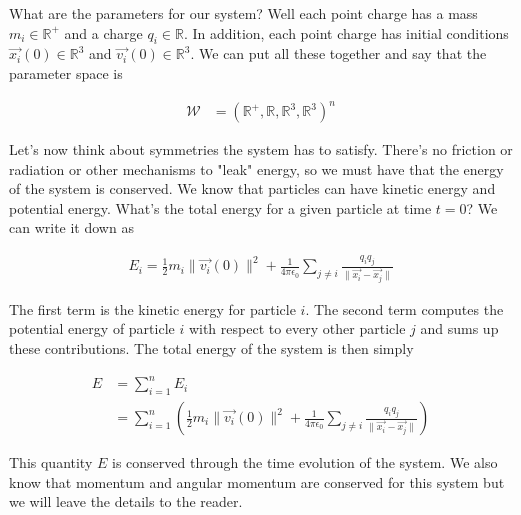 \documentclass[book.tex]{subfiles}
\begin{document}
What are the parameters for our system? Well each point charge has a mass $m_i \in \mathbb{R}^+$ and a charge $q_i \in \mathbb{R}$. In addition, each point charge has initial conditions $\vec{x_i}(0) \in \mathbb{R}^3$ and $\vec{v_i}(0) \in \mathbb{R}^3$. We can put all these together and say that the parameter space is

\begin{align}
    \mathcal{W} &= (\mathbb{R}^+, \mathbb{R}, \mathbb{R}^3, \mathbb{R}^3)^n
\end{align}

Let's now think about symmetries the system has to satisfy. There's no friction or radiation or other mechanisms to "leak" energy, so we must have that the energy of the system is conserved. We know that particles can have kinetic energy and potential energy. What's the total energy for a given particle at time $t = 0$? We can write it down as

\begin{align}
    E_i = \frac{1}{2}m_i \|\vec{v_i}(0)\|^2 + \frac{1}{4\pi \epsilon_0} \sum_{j \neq i} \frac{q_iq_j}{\|\vec{x_i} - \vec{x_j}\|}
\end{align}

The first term is the kinetic energy for particle $i$. The second term computes the potential energy of particle $i$ with respect to every other particle $j$ and sums up these contributions. The total energy of the system is then simply

\begin{align}
E &= \sum_{i=1}^n E_i \\
  &= \sum_{i=1}^n \left (\frac{1}{2} m_i \|\vec{v_i}(0)\|^2 + \frac{1}{4\pi\epsilon_0}\sum_{j \neq i} \frac{q_iq_j}{\|\vec{x_i} - \vec{x_j}\|} \right )
\end{align}

This quantity $E$ is conserved through the time evolution of the system. We also know that momentum and angular momentum are conserved for this system but we will leave the details to the reader.
\end{document}
